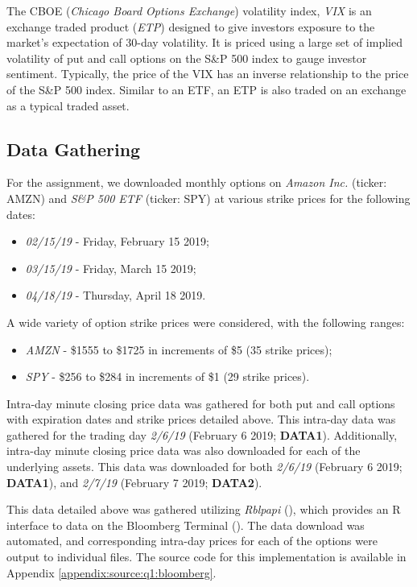 \documentclass[10pt]{article}
\begin{document}
        The CBOE (\textit{Chicago Board Options Exchange}) volatility index, \textit{VIX} is an exchange traded product (\textit{ETP}) designed to give investors exposure to the market's expectation of 30-day volatility. It is priced using a large set of implied volatility of put and call options on the S\&P 500 index to gauge investor sentiment. Typically, the price of the VIX has an inverse relationship to the price of the S\&P 500 index. Similar to an ETF, an ETP is also traded on an exchange as a typical traded asset.


    \subsection{Data Gathering}

    For the assignment, we downloaded monthly options on \textit{Amazon Inc.} (ticker: AMZN) and \textit{S\&P 500 ETF} (ticker: SPY) at various strike prices for the following dates:
    
    \begin{itemize}
        \item \textit{02/15/19} - Friday, February 15 2019;
        \item \textit{03/15/19} - Friday, March 15 2019;
        \item \textit{04/18/19} - Thursday, April 18 2019.
    \end{itemize}

    A wide variety of option strike prices were considered, with the following ranges:
    
    \begin{itemize}
        \item \textit{AMZN} - \$1555 to \$1725 in increments of \$5 (35 strike prices);
        \item \textit{SPY} - \$256 to \$284 in increments of \$1 (29 strike prices).
    \end{itemize}

    Intra-day minute closing price data was gathered for both put and call options with expiration dates and strike prices detailed above. This intra-day data was gathered for the trading day \textit{2/6/19} (February 6 2019; \textbf{DATA1}). Additionally, intra-day minute closing price data was also downloaded for each of the underlying assets. This data was downloaded for both \textit{2/6/19} (February 6 2019; \textbf{DATA1}), and \textit{2/7/19} (February 7 2019; \textbf{DATA2}).

    This data detailed above was gathered utilizing \textit{Rblpapi} (\cite{Armstrong2018}), which provides an R interface to data on the Bloomberg Terminal (\cite{BloombergL.P.2019}). The data download was automated, and corresponding intra-day prices for each of the options were output to individual files. The source code for this implementation is available in Appendix \ref{appendix:source:q1:bloomberg}.
\end{document}
